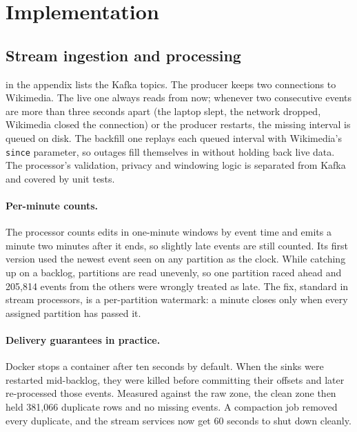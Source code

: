 \section{Implementation}\label{sec:implementation}

\subsection{Stream ingestion and processing}\label{sec:impl-stream}

 in the appendix lists the Kafka topics. The producer keeps two connections to Wikimedia. The live one
always reads from now; whenever two consecutive events are more than three seconds apart (the laptop
slept, the network dropped, Wikimedia closed the connection) or the producer restarts, the missing
interval is queued on disk. The backfill one replays each queued interval with Wikimedia's
\texttt{since} parameter, so outages fill themselves in without holding back live data. The
processor's validation, privacy and windowing logic is separated from Kafka and covered by unit tests.

\paragraph{Per-minute counts.} The processor counts edits in one-minute windows by event time and emits
a minute two minutes after it ends, so slightly late events are still counted. Its first version used
the newest event seen on any partition as the clock. While catching up on a backlog, partitions are
read unevenly, so one partition raced ahead and 205,814 events from the others were wrongly treated as
late. The fix, standard in stream processors, is a per-partition watermark: a minute closes only when
every assigned partition has passed it.

\paragraph{Delivery guarantees in practice.} Docker stops a container after ten seconds by default.
When the sinks were restarted mid-backlog, they were killed before committing their offsets and later
re-processed those events. Measured against the raw zone, the clean zone then held 381,066 duplicate
rows and no missing events. A compaction job removed every duplicate, and the stream services now get
60 seconds to shut down cleanly.

